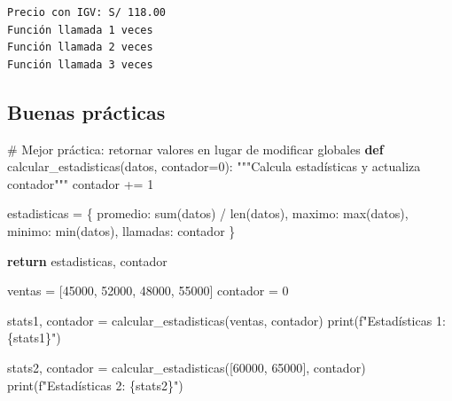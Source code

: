 \documentclass[
  doc,
  floatsintext,
  longtable,
  a4paper,
  nolmodern,
  notxfonts,
  notimes,
  12pt,
  colorlinks=true,linkcolor=blue,citecolor=blue,urlcolor=blue]{apa7}
\newenvironment{Shaded}{\begin{snugshade}}{\end{snugshade}}
\newcommand{\BuiltInTok}[1]{\textcolor[rgb]{0.00,0.23,0.31}{#1}}
\newcommand{\CommentTok}[1]{\textcolor[rgb]{0.37,0.37,0.37}{#1}}
\newcommand{\ControlFlowTok}[1]{\textcolor[rgb]{0.00,0.23,0.31}{\textbf{#1}}}
\newcommand{\DecValTok}[1]{\textcolor[rgb]{0.68,0.00,0.00}{#1}}
\newcommand{\KeywordTok}[1]{\textcolor[rgb]{0.00,0.23,0.31}{\textbf{#1}}}
\newcommand{\NormalTok}[1]{\textcolor[rgb]{0.00,0.23,0.31}{#1}}
\newcommand{\OperatorTok}[1]{\textcolor[rgb]{0.37,0.37,0.37}{#1}}
\newcommand{\SpecialCharTok}[1]{\textcolor[rgb]{0.37,0.37,0.37}{#1}}
\newcommand{\SpecialStringTok}[1]{\textcolor[rgb]{0.13,0.47,0.30}{#1}}
\newcommand{\StringTok}[1]{\textcolor[rgb]{0.13,0.47,0.30}{#1}}
\begin{document}
\begin{verbatim}
Precio con IGV: S/ 118.00
Función llamada 1 veces
Función llamada 2 veces
Función llamada 3 veces
\end{verbatim}

\subsection{Buenas prácticas}\label{buenas-pruxe1cticas}

\begin{Shaded}
\begin{Highlighting}[]
\CommentTok{\# Mejor práctica: retornar valores en lugar de modificar globales}
\KeywordTok{def}\NormalTok{ calcular\_estadisticas(datos, contador}\OperatorTok{=}\DecValTok{0}\NormalTok{):}
    \CommentTok{"""Calcula estadísticas y actualiza contador"""}
\NormalTok{    contador }\OperatorTok{+=} \DecValTok{1}
    
\NormalTok{    estadisticas }\OperatorTok{=}\NormalTok{ \{}
        \StringTok{\textquotesingle{}promedio\textquotesingle{}}\NormalTok{: }\BuiltInTok{sum}\NormalTok{(datos) }\OperatorTok{/} \BuiltInTok{len}\NormalTok{(datos),}
        \StringTok{\textquotesingle{}maximo\textquotesingle{}}\NormalTok{: }\BuiltInTok{max}\NormalTok{(datos),}
        \StringTok{\textquotesingle{}minimo\textquotesingle{}}\NormalTok{: }\BuiltInTok{min}\NormalTok{(datos),}
        \StringTok{\textquotesingle{}llamadas\textquotesingle{}}\NormalTok{: contador}
\NormalTok{    \}}
    
    \ControlFlowTok{return}\NormalTok{ estadisticas, contador}

\NormalTok{ventas }\OperatorTok{=}\NormalTok{ [}\DecValTok{45000}\NormalTok{, }\DecValTok{52000}\NormalTok{, }\DecValTok{48000}\NormalTok{, }\DecValTok{55000}\NormalTok{]}
\NormalTok{contador }\OperatorTok{=} \DecValTok{0}

\NormalTok{stats1, contador }\OperatorTok{=}\NormalTok{ calcular\_estadisticas(ventas, contador)}
\BuiltInTok{print}\NormalTok{(}\SpecialStringTok{f"Estadísticas 1: }\SpecialCharTok{\{}\NormalTok{stats1}\SpecialCharTok{\}}\SpecialStringTok{"}\NormalTok{)}

\NormalTok{stats2, contador }\OperatorTok{=}\NormalTok{ calcular\_estadisticas([}\DecValTok{60000}\NormalTok{, }\DecValTok{65000}\NormalTok{], contador)}
\BuiltInTok{print}\NormalTok{(}\SpecialStringTok{f"Estadísticas 2: }\SpecialCharTok{\{}\NormalTok{stats2}\SpecialCharTok{\}}\SpecialStringTok{"}\NormalTok{)}
\end{Highlighting}
\end{Shaded}
\end{document}
